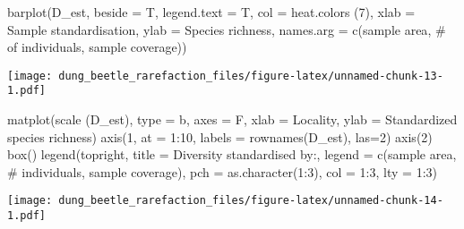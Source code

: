 \documentclass[
]{article}
\newenvironment{Shaded}{\begin{snugshade}}{\end{snugshade}}
\newcommand{\AttributeTok}[1]{\textcolor[rgb]{0.77,0.63,0.00}{#1}}
\newcommand{\DecValTok}[1]{\textcolor[rgb]{0.00,0.00,0.81}{#1}}
\newcommand{\FunctionTok}[1]{\textcolor[rgb]{0.00,0.00,0.00}{#1}}
\newcommand{\NormalTok}[1]{#1}
\newcommand{\SpecialCharTok}[1]{\textcolor[rgb]{0.00,0.00,0.00}{#1}}
\newcommand{\StringTok}[1]{\textcolor[rgb]{0.31,0.60,0.02}{#1}}
\begin{document}
\begin{Shaded}
\begin{Highlighting}[]
\FunctionTok{barplot}\NormalTok{(D\_est, }\AttributeTok{beside =}\NormalTok{ T, }\AttributeTok{legend.text =}\NormalTok{ T, }\AttributeTok{col =} \FunctionTok{heat.colors}\NormalTok{ (}\DecValTok{7}\NormalTok{), }\AttributeTok{xlab =} \StringTok{\textquotesingle{}Sample standardisation\textquotesingle{}}\NormalTok{,}
         \AttributeTok{ylab =} \StringTok{\textquotesingle{}Species richness\textquotesingle{}}\NormalTok{, }\AttributeTok{names.arg =} \FunctionTok{c}\NormalTok{(}\StringTok{\textquotesingle{}sample area\textquotesingle{}}\NormalTok{, }\StringTok{\textquotesingle{}\# of individuals\textquotesingle{}}\NormalTok{, }\StringTok{\textquotesingle{}sample coverage\textquotesingle{}}\NormalTok{))}
\end{Highlighting}
\end{Shaded}

\texttt{[image: dung\_beetle\_rarefaction\_files/figure-latex/unnamed-chunk-13-1.pdf]}

\begin{Shaded}
\begin{Highlighting}[]
\FunctionTok{matplot}\NormalTok{(}\FunctionTok{scale}\NormalTok{ (D\_est), }\AttributeTok{type =} \StringTok{\textquotesingle{}b\textquotesingle{}}\NormalTok{, }\AttributeTok{axes =}\NormalTok{ F, }\AttributeTok{xlab =} \StringTok{\textquotesingle{}Locality\textquotesingle{}}\NormalTok{, }\AttributeTok{ylab =} \StringTok{\textquotesingle{}Standardized species richness\textquotesingle{}}\NormalTok{)}
\FunctionTok{axis}\NormalTok{(}\DecValTok{1}\NormalTok{, }\AttributeTok{at =} \DecValTok{1}\SpecialCharTok{:}\DecValTok{10}\NormalTok{, }\AttributeTok{labels =} \FunctionTok{rownames}\NormalTok{(D\_est), }\AttributeTok{las=}\DecValTok{2}\NormalTok{)}
\FunctionTok{axis}\NormalTok{(}\DecValTok{2}\NormalTok{)}
\FunctionTok{box}\NormalTok{()}
\FunctionTok{legend}\NormalTok{(}\StringTok{\textquotesingle{}topright\textquotesingle{}}\NormalTok{, }\AttributeTok{title =} \StringTok{\textquotesingle{}Diversity standardised by:\textquotesingle{}}\NormalTok{, }\AttributeTok{legend =} \FunctionTok{c}\NormalTok{(}\StringTok{\textquotesingle{}sample area\textquotesingle{}}\NormalTok{, }\StringTok{\textquotesingle{}\# individuals\textquotesingle{}}\NormalTok{, }\StringTok{\textquotesingle{}sample coverage\textquotesingle{}}\NormalTok{), }\AttributeTok{pch =} \FunctionTok{as.character}\NormalTok{(}\DecValTok{1}\SpecialCharTok{:}\DecValTok{3}\NormalTok{), }\AttributeTok{col =} \DecValTok{1}\SpecialCharTok{:}\DecValTok{3}\NormalTok{, }\AttributeTok{lty =} \DecValTok{1}\SpecialCharTok{:}\DecValTok{3}\NormalTok{)}
\end{Highlighting}
\end{Shaded}

\texttt{[image: dung\_beetle\_rarefaction\_files/figure-latex/unnamed-chunk-14-1.pdf]}
\end{document}
